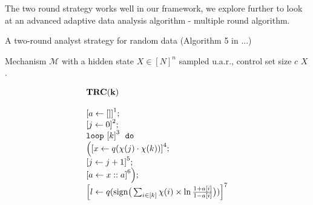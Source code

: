 The two round strategy works well in our framework, we explore further to look at an advanced adaptive data analysis algorithm - multiple round algorithm.
\begin{example}
    \begin{algorithm}
    \footnotesize
    \caption{A two-round analyst strategy for random data (Algorithm 5 in ...)}
    \label{alg:twoRound}
    \begin{algorithmic}
    \REQUIRE Mechanism $\mathcal{M}$ with a hidden state $X\in [N]^{n}$ sampled u.a.r., control set size $c$
    \RETURN $X$.
    \end{algorithmic}
    \end{algorithm}
    \[
    \begin{array}{l}
        \bf{TRC}(k) \\
            \\
           \clabel{ a \leftarrow []}^{1} ; \\
            \clabel{\assign{j}{0} }^{2} ; \\
            \eloop ~ \clabel{k}^{3} ~ \edo ~ \\
            \Big(
             \clabel{x \leftarrow q(\chi(j)\cdot \chi(k)) }^{4}  ; \\
             \clabel{\assign{j}{j+1}}^{5} ;\\
            \clabel{a \leftarrow x :: a}^{6}       \Big);\\
            \clabel{l \leftarrow q(\mathrm{sign}\big (\sum_{i\in [k]} \chi(i)\times\ln\frac{1+a[i]}{1-a[i]} \big ))}^{7}\\
        \end{array}
    \]
    \end{example}

